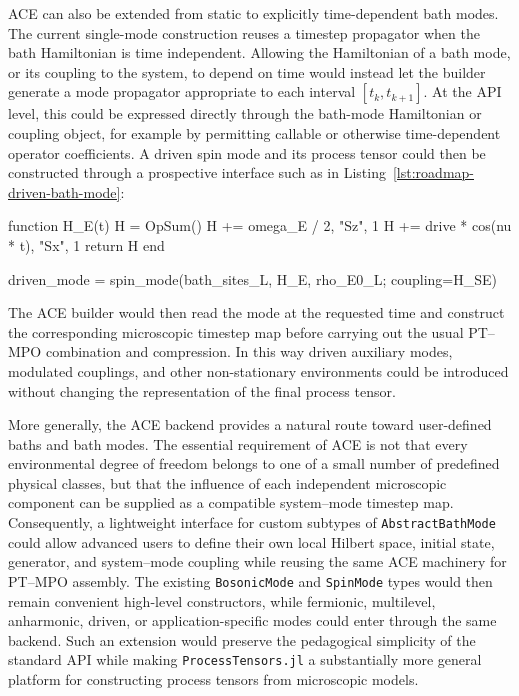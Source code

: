ACE can also be extended from static to explicitly time-dependent bath modes.
The current single-mode construction reuses a timestep propagator when the bath Hamiltonian is time independent.
Allowing the Hamiltonian of a bath mode, or its coupling to the system, to depend on time would instead let the builder generate a mode propagator appropriate to each interval \([t_k,t_{k+1}]\).
At the API level, this could be expressed directly through the bath-mode Hamiltonian or coupling object, for example by permitting callable or otherwise time-dependent operator coefficients.
A driven spin mode and its process tensor could then be constructed through a prospective interface such as in Listing~\ref{lst:roadmap-driven-bath-mode}:
%
\begin{juliacode}[
    caption={Prospective ACE construction for a bath mode with a time-dependent Hamiltonian.},
    label={lst:roadmap-driven-bath-mode},
]
function H_E(t)
    H = OpSum()
    H += omega_E / 2, "Sz", 1
    H += drive * cos(nu * t), "Sx", 1
    return H
end

driven_mode = spin_mode(bath_sites_L, H_E, rho_E0_L; coupling=H_SE)
\end{juliacode}
%
\noindent
The ACE builder would then read the mode at the requested time and construct the corresponding microscopic timestep map before carrying out the usual PT--MPO combination and compression.
In this way driven auxiliary modes, modulated couplings, and other non-stationary environments could be introduced without changing the representation of the final process tensor.

More generally, the ACE backend provides a natural route toward user-defined baths and bath modes.
The essential requirement of ACE is not that every environmental degree of freedom belongs to one of a small number of predefined physical classes, but that the influence of each independent microscopic component can be supplied as a compatible system--mode timestep map.
Consequently, a lightweight interface for custom subtypes of \texttt{AbstractBathMode} could allow advanced users to define their own local Hilbert space, initial state, generator, and system--mode coupling while reusing the same ACE machinery for PT--MPO assembly.
The existing \texttt{BosonicMode} and \texttt{SpinMode} types would then remain convenient high-level constructors, while fermionic, multilevel, anharmonic, driven, or application-specific modes could enter through the same backend.
Such an extension would preserve the pedagogical simplicity of the standard API while making \texttt{ProcessTensors.jl} a substantially more general platform for constructing process tensors from microscopic models.

